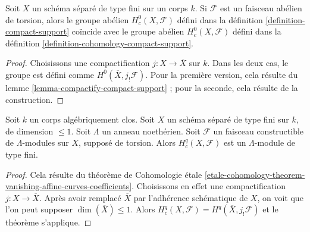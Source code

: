 \begin{lemma}
\label{lemma-compact-support-h0}
Soit $X$ un schéma séparé de type fini sur un corps $k$.
Si $\mathcal{F}$ est un faisceau abélien de torsion, alors le groupe abélien
$H^0_c(X, \mathcal{F})$ défini dans la définition \ref{definition-compact-support}
coïncide avec le groupe abélien $H^0_c(X, \mathcal{F})$ défini dans la
définition \ref{definition-cohomology-compact-support}.
\end{lemma}

\begin{proof}
Choisissons une compactification $j : X \to \overline{X}$ sur $k$.
Dans les deux cas, le groupe est défini comme $H^0(\overline{X}, j_!\mathcal{F})$.
Pour la première version, cela résulte du
lemme \ref{lemma-compactify-compact-support} ;
pour la seconde, cela résulte de la construction.
\end{proof}

\begin{lemma}
\label{lemma-finiteness-curves}
Soit $k$ un corps algébriquement clos. Soit $X$ un schéma séparé
de type fini sur $k$, de dimension $\leq 1$.
Soit $\Lambda$ un anneau noethérien.
Soit $\mathcal{F}$ un faisceau constructible de $\Lambda$-modules
sur $X$, supposé de torsion. Alors $H^q_c(X, \mathcal{F})$ est un
$\Lambda$-module de type fini.
\end{lemma}

\begin{proof}
Cela résulte du théorème de Cohomologie étale
\ref{etale-cohomology-theorem-vanishing-affine-curves-coefficients}.
Choisissons en effet une compactification $j : X \to \overline{X}$.
Après avoir remplacé $\overline{X}$ par l'adhérence schématique
de $X$, on voit que l'on peut supposer $\dim(\overline{X}) \leq 1$.
Alors $H^q_c(X, \mathcal{F}) = H^q(\overline{X}, j_!\mathcal{F})$
et le théorème s'applique.
\end{proof}

